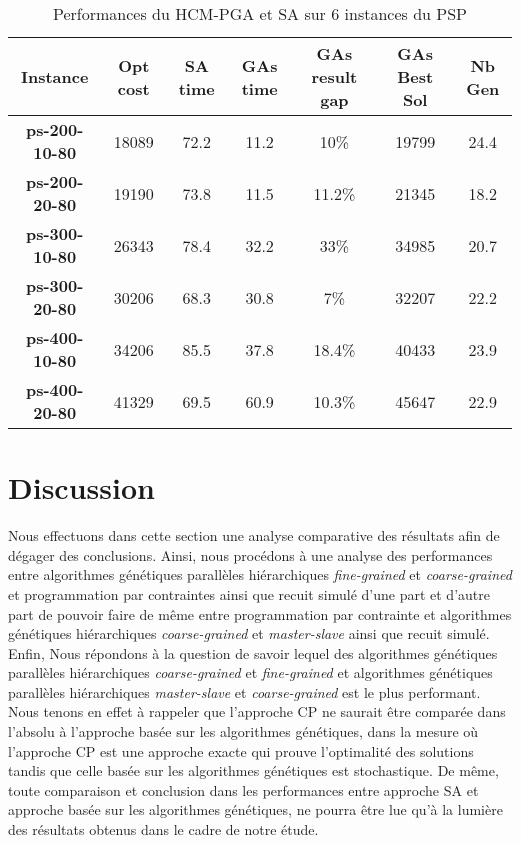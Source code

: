 	\begin{table}[h]
		\centering
		\begin{tabular}{|c|c|c|c|c|c|c|}
			\hline
			\textbf{Instance} & \textbf{Opt cost} & \textbf{SA time} & \textbf{GAs time} & \textbf{GAs result gap} & \textbf{GAs Best Sol} & \textbf{Nb Gen}\\
			\hline
			\textbf{ps-200-10-80} & 18089 & 72.2 & 11.2 & 10\% & 19799 & 24.4 \\
			\textbf{ps-200-20-80} & 19190 & 73.8 & 11.5 & 11.2\% & 21345 & 18.2 \\
			\textbf{ps-300-10-80} & 26343 & 78.4 & 32.2 & 33\% & 34985 & 20.7 \\
			\textbf{ps-300-20-80} & 30206 & 68.3 & 30.8 & 7\% & 32207 & 22.2 \\
			\textbf{ps-400-10-80} & 34206 & 85.5 & 37.8 & 18.4\% & 40433 & 23.9 \\
			\textbf{ps-400-20-80} & 41329 & 69.5 & 60.9 & 10.3\% & 45647 & 22.9 \\
			\hline
		\end{tabular}	
		\caption{Performances du HCM-PGA et SA sur 6 instances du PSP}	
		\label{tab:hcm_pga_sa}	
	\end{table}					
	
		\section{Discussion}
		Nous effectuons dans cette section une analyse comparative des résultats afin de dégager des conclusions. Ainsi, nous procédons à une analyse des performances entre algorithmes génétiques parallèles hiérarchiques \emph{fine-grained} et \emph{coarse-grained} et programmation par contraintes ainsi que recuit simulé d'une part et d'autre part de pouvoir faire de même entre programmation par contrainte et algorithmes génétiques hiérarchiques \emph{coarse-grained} et \emph{master-slave} ainsi que recuit simulé. Enfin, Nous répondons à la question de savoir lequel des algorithmes génétiques parallèles hiérarchiques \emph{coarse-grained} et \emph{fine-grained} et algorithmes génétiques parallèles hiérarchiques \emph{master-slave} et \emph{coarse-grained} est le plus performant. Nous tenons en effet à rappeler que l'approche CP ne saurait être comparée dans l'absolu à l'approche basée sur les algorithmes génétiques, dans la mesure où l'approche CP est une approche exacte qui prouve l'optimalité des solutions tandis que celle basée sur les algorithmes génétiques est stochastique. De même, toute comparaison et conclusion dans les performances entre approche SA et approche basée sur les algorithmes génétiques, ne pourra être lue qu'à la lumière des résultats obtenus dans le cadre de notre étude.
		
